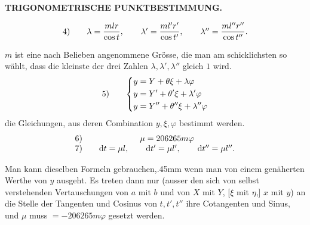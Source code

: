 \par\clearpage
\noindent\null\hfill{\small\textbf{TRIGONOMETRISCHE PUNKTBESTIMMUNG.}}\hfill{}\par\medskip

\[
\begin{array}{@{}l@{\qquad}c@{}}
 4)&
 \lambda=\dfrac{mlr}{\cos t},\qquad
 \lambda'=\dfrac{ml'r'}{\cos t'},\qquad
 \lambda''=\dfrac{ml''r''}{\cos t''}.
\end{array}
\]

\(m\) ist eine nach Belieben angenommene Grösse, die man am schicklichsten so wählt, dass die kleinste der drei Zahlen \(\lambda,\lambda',\lambda''\) gleich \(1\) wird.
\[
\begin{array}{@{}l@{\qquad}c@{}}
 5)&
 \left\{\begin{aligned}
 y&=Y+\theta\xi+\lambda\varphi\\
 y&=Y'+\theta'\xi+\lambda'\varphi\\
 y&=Y''+\theta''\xi+\lambda''\varphi
 \end{aligned}\right.
\end{array}
\]
\noindent [sind] die Gleichungen, aus deren Combination \(y,\xi,\varphi\) bestimmt werden.
\[
\begin{array}{@{}l@{\qquad}c@{}}
 6)&\mu=206265m\varphi\\
 7)&\mathrm{d}t=\mu l,\qquad
 \mathrm{d}t'=\mu l',\qquad
 \mathrm{d}t''=\mu l''.
\end{array}
\]


Man kann dieselben Formeln gebrauchen,\kern.45mm\raisebox{.08ex}{\rule{.70mm}{.18mm}} wenn man von einem genäherten Werthe von \(y\) ausgeht. Es treten dann nur (ausser den sich von selbst verstehenden Vertauschungen von \(a\) mit \(b\) und von \(X\) mit \(Y\), [\(\xi\) mit \(\eta\),] \(x\) mit \(y\)) an die Stelle der Tangenten und Cosinus von \(t,t',t''\) ihre Cotangenten und Sinus, und \(\mu\) muss \(=-206265m\varphi\) gesetzt werden.

